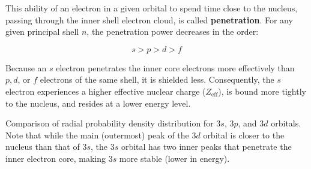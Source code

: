 \documentclass[12pt,a4paper]{article}
\begin{document}
This ability of an electron in a given orbital to spend time close to the nucleus, passing through the inner shell electron cloud, is called \textbf{penetration}. For any given principal shell $n$, the penetration power decreases in the order:

\begin{tcolorbox}[formulabox, title={Penetration Power Trend}]
  \[ s > p > d > f \]
\end{tcolorbox}

Because an $s$ electron penetrates the inner core electrons more effectively than $p, d$, or $f$ electrons of the same shell, it is shielded less. Consequently, the $s$ electron experiences a higher effective nuclear charge ($Z_{\text{eff}}$), is bound more tightly to the nucleus, and resides at a lower energy level.

\begin{tcolorbox}[tikzbox, title={Radial Probability Distribution Curves for $n=3$ Orbitals}]
\begin{center}
\par\vspace{4pt}
\small\color{mydark}
Comparison of radial probability density distribution for $3s$, $3p$, and $3d$ orbitals. Note that while the main (outermost) peak of the $3d$ orbital is closer to the nucleus than that of $3s$, the $3s$ orbital has two inner peaks that penetrate the inner electron core, making $3s$ more stable (lower in energy).
\end{center}
\end{tcolorbox}
\end{document}
